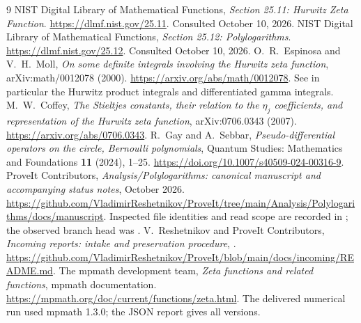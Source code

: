 \begin{thebibliography}{9}
NIST Digital Library of Mathematical Functions,
\emph{Section 25.11: Hurwitz Zeta Function}.
\url{https://dlmf.nist.gov/25.11}. Consulted October 10, 2026.
NIST Digital Library of Mathematical Functions,
\emph{Section 25.12: Polylogarithms}.
\url{https://dlmf.nist.gov/25.12}. Consulted October 10, 2026.
O.~R.~Espinosa and V.~H.~Moll,
\emph{On some definite integrals involving the Hurwitz zeta function},
arXiv:math/0012078 (2000).
\url{https://arxiv.org/abs/math/0012078}.
See in particular the Hurwitz product integrals and differentiated gamma integrals.
M.~W.~Coffey,
\emph{The Stieltjes constants, their relation to the $\eta_j$ coefficients, and representation of the Hurwitz zeta function},
arXiv:0706.0343 (2007).
\url{https://arxiv.org/abs/0706.0343}.
R.~Gay and A.~Sebbar,
\emph{Pseudo-differential operators on the circle, Bernoulli polynomials},
Quantum Studies: Mathematics and Foundations \textbf{11} (2024), 1--25.
\url{https://doi.org/10.1007/s40509-024-00316-9}.
ProveIt Contributors,
\emph{Analysis/Polylogarithms: canonical manuscript and accompanying status notes}, October 2026.
\url{https://github.com/VladimirReshetnikov/ProveIt/tree/main/Analysis/Polylogarithms/docs/manuscript}.
Inspected file identities and read scope are recorded in ; the observed branch head was .
V.~Reshetnikov and ProveIt Contributors,
\emph{Incoming reports: intake and preservation procedure},
.
\url{https://github.com/VladimirReshetnikov/ProveIt/blob/main/docs/incoming/README.md}.
The mpmath development team,
\emph{Zeta functions and related functions}, mpmath documentation.
\url{https://mpmath.org/doc/current/functions/zeta.html}.
The delivered numerical run used mpmath 1.3.0; the JSON report gives all versions.
\end{thebibliography}
